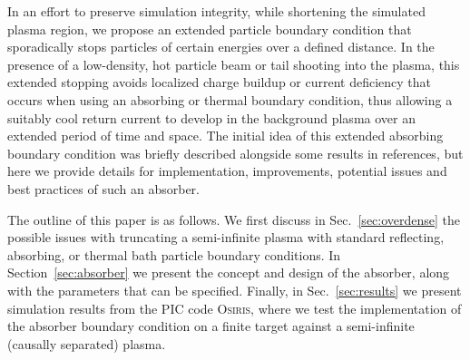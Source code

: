 \documentclass[../absorber.tex]{subfiles}
\begin{document}
In an effort to preserve simulation integrity, while shortening the simulated plasma region, we propose an extended particle boundary condition that sporadically stops particles of certain energies over a defined distance.  In the presence of a low-density, hot particle beam or tail shooting into the plasma, this extended stopping avoids localized charge buildup or current deficiency that occurs when using an absorbing or thermal boundary condition, thus allowing a suitably cool return current to develop in the background plasma over an extended period of time and space.  The initial idea of this extended absorbing boundary condition was briefly described alongside some results in references,\cite{Tonge2009ALasers,Kemp2014LaserplasmaIgnition} but here we provide details for implementation, improvements, potential issues and best practices of such an absorber.

The outline of this paper is as follows.  We first discuss in Sec.~\ref{sec:overdense} the possible issues with truncating a semi-infinite plasma with standard reflecting, absorbing, or thermal bath particle boundary conditions. In Section~\ref{sec:absorber} we present the concept and design of the absorber, along with the parameters that can be specified.  Finally, in Sec.~\ref{sec:results} we present simulation results from the PIC code \textsc{Osiris}, where we test the implementation of the absorber boundary condition on a finite target against a semi-infinite (causally separated) plasma.
\end{document}
